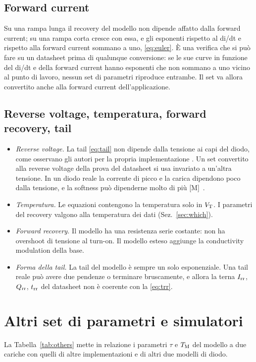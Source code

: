 \documentclass[10pt,a4paper]{scrartcl}
\let\newcommand\pdvaluedefine
\newcommand{\Irr}{I_\mathrm{rr}}
\newcommand{\Qrr}{Q_\mathrm{rr}}
\newcommand{\trr}{t_\mathrm{rr}}
\newcommand{\TM}{T_\mathrm{M}}
\newcommand{\VT}{V_\mathrm{T}}
\begin{document}
\subsection{Forward current}
Su una rampa lunga il recovery del modello non dipende affatto dalla forward current; su una rampa corta cresce con essa, e gli esponenti rispetto al di/dt e rispetto alla forward current sommano a uno, \eqref{eq:euler}. È una verifica che si può fare su un datasheet prima di qualunque conversione: se le sue curve in funzione del di/dt e della forward current hanno esponenti che non sommano a uno vicino al punto di lavoro, nessun set di parametri riproduce entrambe. Il set va allora convertito anche alla forward current dell'applicazione.

\subsection{Reverse voltage, temperatura, forward recovery, tail}
\label{sec:otherlimits}
\begin{itemize}
\item \emph{Reverse voltage.} La tail \eqref{eq:tail} non dipende dalla tensione ai capi del diodo, come osservano gli autori per la propria implementazione \cite{pemodels}. Un set convertito alla reverse voltage della prova del datasheet si usa invariato a un'altra tensione. In un diodo reale la corrente di picco e la carica dipendono poco dalla tensione, e la softness può dipenderne molto di più [M]~\cite{lutz}.
\item \emph{Temperatura.} Le equazioni contengono la temperatura solo in $\VT$. I parametri del recovery valgono alla temperatura dei dati (Sez.~\ref{sec:which}).
\item \emph{Forward recovery.} Il modello ha una resistenza serie costante: non ha overshoot di tensione al turn-on. Il modello esteso \cite{ma1993} aggiunge la conductivity modulation della base.
\item \emph{Forma della tail.} La tail del modello è sempre un solo esponenziale. Una tail reale può avere due pendenze o terminare bruscamente, e allora la terna $\Irr$, $\Qrr$, $\trr$ del datasheet non è coerente con la \eqref{eq:trr}.
\end{itemize}

\section{Altri set di parametri e simulatori}
\label{sec:others}
La Tabella~\ref{tab:others} mette in relazione i parametri $\tau$ e $\TM$ del modello a due cariche con quelli di altre implementazioni e di altri due modelli di diodo.
\end{document}
